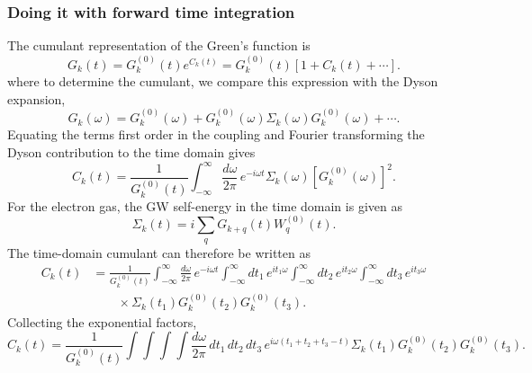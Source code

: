 \subsubsection{Doing it with forward time integration }
The cumulant representation of the Green's function is
\begin{equation}
    G_k(t)
    =
    G_k^{(0)}(t)e^{C_k(t)}
    =
    G_k^{(0)}(t)
    \left[
        1+C_k(t)+\cdots
    \right].
\label{eq:ha_cumulant_ansatz}
\end{equation}
where to determine the cumulant, we compare this expression with the Dyson
expansion,
\begin{equation}
    G_k(\omega)
    =
    G_k^{(0)}(\omega)
    +
    G_k^{(0)}(\omega)
    \Sigma_k(\omega)
    G_k^{(0)}(\omega)
    +\cdots.
\label{eq:ha_dyson_expansion}
\end{equation}
Equating the terms first order in the coupling and Fourier transforming
the Dyson contribution to the time domain gives
\begin{equation}
    C_k(t)
    =
    \frac{1}{G_k^{(0)}(t)}
    \int_{-\infty}^{\infty}
    \frac{d\omega}{2\pi}\,
    e^{-i\omega t}
    \Sigma_k(\omega)
    \left[
        G_k^{(0)}(\omega)
    \right]^2.
\label{eq:ha_cumulant_frequency}
\end{equation}
For the electron gas, the GW self-energy in the time domain is given as 
\begin{equation}
    \Sigma_k(t)
    =
    i
    \sum_q
    G_{k+q}(t)
    W_q^{(0)}(t).
\label{eq:ha_gw_selfenergy_time}
\end{equation}
The time-domain cumulant can therefore be written as
\begin{align}
    C_k(t)
    &=
    \frac{1}{G_k^{(0)}(t)}
    \int_{-\infty}^{\infty}
    \frac{d\omega}{2\pi}\,
    e^{-i\omega t}
    \int_{-\infty}^{\infty}
    dt_1\,e^{i t_1\omega}
    \int_{-\infty}^{\infty}
    dt_2\,e^{i t_2\omega}
    \int_{-\infty}^{\infty}
    dt_3\,e^{i t_3\omega}
    \nonumber\\
    &\qquad\times
    \Sigma_k(t_1)
    G_k^{(0)}(t_2)
    G_k^{(0)}(t_3).
\label{eq:ha_cumulant_time_full}
\end{align}
Collecting the exponential factors,
\begin{equation}
    C_k(t)
    =
    \frac{1}{G_k^{(0)}(t)}
    \int\!\!\int\!\!\int\!\!\int
    \frac{d\omega}{2\pi}\,
    dt_1\,dt_2\,dt_3\,
    e^{i\omega(t_1+t_2+t_3-t)}
    \Sigma_k(t_1)
    G_k^{(0)}(t_2)
    G_k^{(0)}(t_3).
\label{eq:ha_cumulant_combined_exp}
\end{equation}
